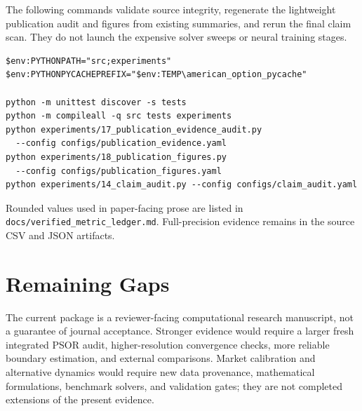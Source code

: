 \documentclass[11pt]{article}
\begin{document}
The following commands validate source integrity, regenerate the lightweight
publication audit and figures from existing summaries, and rerun the final claim
scan. They do not launch the expensive solver sweeps or neural training stages.
\begin{verbatim}
$env:PYTHONPATH="src;experiments"
$env:PYTHONPYCACHEPREFIX="$env:TEMP\american_option_pycache"

python -m unittest discover -s tests
python -m compileall -q src tests experiments
python experiments/17_publication_evidence_audit.py
  --config configs/publication_evidence.yaml
python experiments/18_publication_figures.py
  --config configs/publication_figures.yaml
python experiments/14_claim_audit.py --config configs/claim_audit.yaml
\end{verbatim}

Rounded values used in paper-facing prose are listed in
\texttt{docs/verified\_metric\_ledger.md}. Full-precision evidence remains in
the source CSV and JSON artifacts.

\section{Remaining Gaps}

The current package is a reviewer-facing computational research manuscript, not
a guarantee of journal acceptance. Stronger evidence would require a larger
fresh integrated PSOR audit, higher-resolution convergence checks, more reliable
boundary estimation, and external comparisons. Market calibration and
alternative dynamics would require new data provenance, mathematical
formulations, benchmark solvers, and validation gates; they are not completed
extensions of the present evidence.


\end{document}
